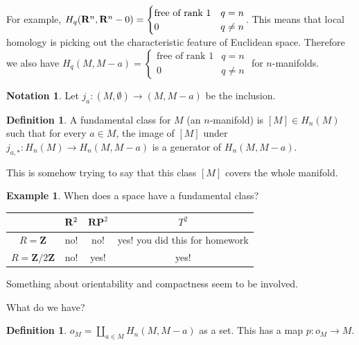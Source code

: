 \documentclass{amsart}
\theoremstyle{theorem}
\theoremstyle{definition}
\newtheorem{definition}[theorem]{Definition}
\newtheorem{notation}[theorem]{Notation}
\newtheorem{example}[theorem]{Example}
\newcommand{\RP}{\mathbf{RP}}
\newcommand{\Z}{\mathbf Z}
\begin{document}
For example, $H_q(\mathbf R^n,\mathbf R^n-0)=\begin{cases}\text{free of rank }1 & q=n \\ 0 & q\neq n\end{cases}$. This means that local homology is picking out the characteristic feature of Euclidean space. Therefore we also have $H_q(M,M-a)=\begin{cases}\text{free of rank }1 & q=n \\ 0 & q\neq n\end{cases}$ for $n$-manifolds.
\begin{notation}
Let $j_a:(M,\emptyset)\to (M,M-a)$ be the inclusion.
\end{notation}
\begin{definition}
A fundamental class for $M$ (an $n$-manifold) is $[M]\in H_n(M)$ such that for every $a\in M$, the image of $[M]$ under $j_{a,\ast}:H_n(M)\to H_n(M,M-a)$ is a generator of $H_n(M,M-a)$.
\end{definition}
This is somehow trying to say that this class $[M]$ covers the whole manifold.
\begin{example}
When does a space have a fundamental class?
\begin{center}
\begin{tabular}{c|c c c } 
 \hline
  & $\mathbf R^2$ & $\RP^2$ & $T^2$ \\ 
  \hline
 $R=\Z$ & no! & no! & yes! you did this for homework \\
 $R=\Z/2\Z$ & no! & yes! & yes!
\end{tabular}
\end{center}
Something about orientability and compactness seem to be involved.
\end{example}
What do we have? 
\begin{definition}
$o_M=\coprod_{a\in M}H_n(M,M-a)$ as a set. This has a map $p:o_M\to M$.
\end{definition}
\end{document}
